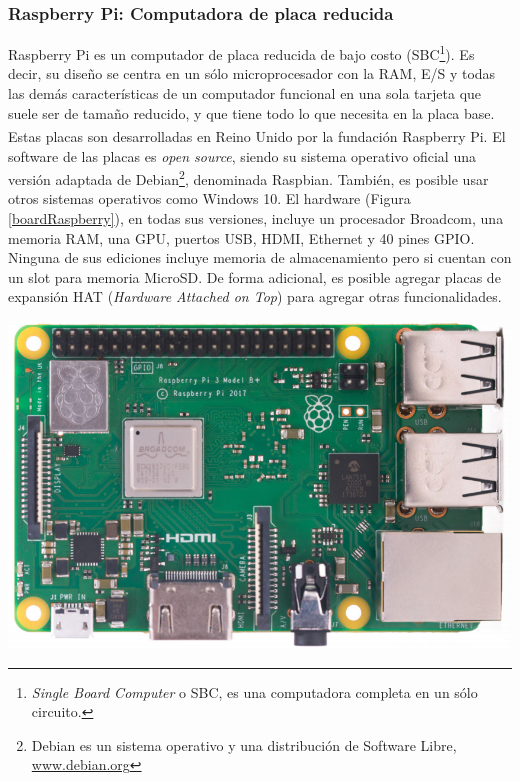         \subsubsection{Raspberry Pi: Computadora de placa reducida}
            \par Raspberry\textsuperscript{\textregistered} Pi es un computador de placa reducida de bajo costo (SBC\footnote{\textit{Single Board Computer} o SBC, es una computadora completa en un sólo circuito.}). Es decir, su diseño se centra en un sólo microprocesador con la RAM, E/S y todas las demás características de un computador funcional en una sola tarjeta que suele ser de tamaño reducido, y que tiene todo lo que necesita en la placa base. Estas placas son desarrolladas en Reino Unido por la fundación Raspberry\textsuperscript{\textregistered} Pi. El software de las placas es \textit{open source}, siendo su sistema operativo oficial una versión adaptada de Debian\footnote{Debian es un sistema operativo y una distribución de Software Libre, \url{www.debian.org}}, denominada Raspbian. También, es posible usar otros sistemas operativos como Windows 10. El hardware (Figura \ref{boardRaspberry}), en todas sus versiones, incluye un procesador Broadcom, una memoria RAM, una GPU, puertos USB, HDMI, Ethernet y 40 pines GPIO. Ninguna de sus ediciones incluye memoria de almacenamiento pero si cuentan con un slot para memoria MicroSD. De forma adicional, es posible agregar placas de expansión HAT (\textit{Hardware Attached on Top}) para agregar otras funcionalidades.
            
            \begin{center}
                \includegraphics[scale=0.30]{hardware/raspberrypib3.jpg}
                
                \label{boardRaspberry}
            \end{center}
           
